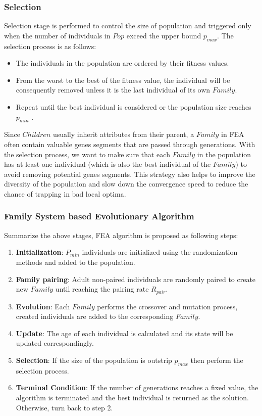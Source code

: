 \documentclass[final]{elsarticle}
\begin{document}
\subsubsection{Selection}

Selection stage is performed to control the size of population and triggered only when the number of individuals in $Pop$ exceed the upper bound $p_{max}$. The selection process is as follows: 
\begin{itemize}
	\item The individuals in the population are ordered by their fitness values. 
	\item From the worst to the best of the fitness value, the individual will be consequently removed unless it is the last individual of its own $ Family $. 
	\item Repeat until the best individual is considered or the population size reaches $p_{min}$ .
\end{itemize}
Since $Children$ usually inherit attributes from their parent, a $Family$ in FEA often contain valuable genes segments that are passed through generations. With the selection process, we want to make sure that each $ Family $ in the population has at least one individual (which is also the best individual of the $ Family $) to avoid removing potential genes segments. This strategy also helps to improve the diversity of the population and slow down the convergence speed to reduce the chance of trapping in bad local optima.

\subsubsection{Family System based Evolutionary Algorithm}

Summarize the above stages, FEA algorithm is proposed as following steps:

\begin{enumerate}
	\item \textbf{Initialization}: $P_{min}$ individuals are initialized using the randomization methods and added to the population.
	\item \textbf{Family pairing}: Adult non-paired individuals are randomly paired to create new $ Family $ until reaching the pairing rate $R_{pair}$.
	\item \textbf{Evolution}: Each $ Family $ performs the crossover and mutation process, created individuals are added to the corresponding $ Family $.
	\item \textbf{Update}: The age of each individual is calculated and its state will be updated correspondingly.
	\item \textbf{Selection}: If the size of the population is outstrip $p_{max}$ then perform the selection process.
	\item \textbf{Terminal Condition}: If the number of generations reaches a fixed value, the algorithm is terminated and the best individual is returned as the solution. Otherwise, turn back to step 2.
\end{enumerate}
\end{document}
